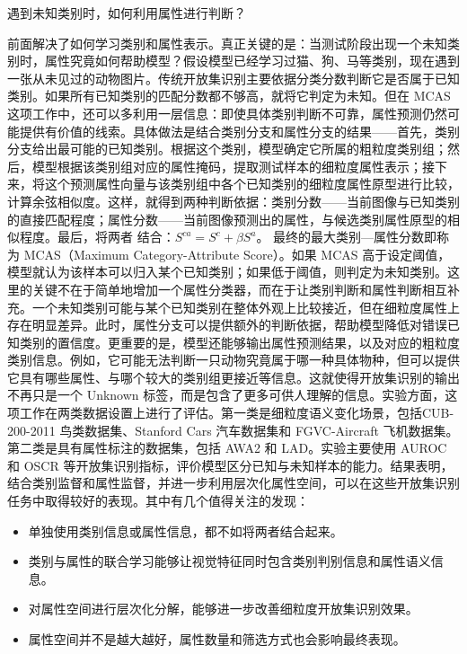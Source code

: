 遇到未知类别时，如何利用属性进行判断？

前面解决了如何学习类别和属性表示。真正关键的是：当测试阶段出现一个未知类别时，属性究竟如何帮助模型？假设模型已经学习过猫、狗、马等类别，现在遇到一张从未见过的动物图片。传统开放集识别主要依据分类分数判断它是否属于已知类别。如果所有已知类别的匹配分数都不够高，就将它判定为未知。但在 MCAS 这项工作中，还可以多利用一层信息：即使具体类别判断不可靠，属性预测仍然可能提供有价值的线索。具体做法是结合类别分支和属性分支的结果——首先，类别分支给出最可能的已知类别。根据这个类别，模型确定它所属的粗粒度类别组；然后，模型根据该类别组对应的属性掩码，提取测试样本的细粒度属性表示；接下来，将这个预测属性向量与该类别组中各个已知类别的细粒度属性原型进行比较，计算余弦相似度。这样，就得到两种判断依据：类别分数——当前图像与已知类别的直接匹配程度；属性分数——当前图像预测出的属性，与候选类别属性原型的相似程度。最后，将两者 结合：$S^{ca}=S^{c}+\beta S^{a}$。 最终的最大类别—属性分数即称为 MCAS（Maximum Category-Attribute Score）。如果 MCAS 高于设定阈值，模型就认为该样本可以归入某个已知类别；如果低于阈值，则判定为未知类别。这里的关键不在于简单地增加一个属性分类器，而在于让类别判断和属性判断相互补充。一个未知类别可能与某个已知类别在整体外观上比较接近，但在细粒度属性上存在明显差异。此时，属性分支可以提供额外的判断依据，帮助模型降低对错误已知类别的置信度。更重要的是，模型还能够输出属性预测结果，以及对应的粗粒度类别信息。例如，它可能无法判断一只动物究竟属于哪一种具体物种，但可以提供它具有哪些属性、与哪个较大的类别组更接近等信息。这就使得开放集识别的输出不再只是一个 Unknown 标签，而是包含了更多可供人理解的信息。实验方面，这项工作在两类数据设置上进行了评估。第一类是细粒度语义变化场景，包括CUB-200-2011 鸟类数据集、Stanford Cars 汽车数据集和 FGVC-Aircraft 飞机数据集。第二类是具有属性标注的数据集，包括 AWA2 和 LAD。实验主要使用 AUROC 和 OSCR 等开放集识别指标，评价模型区分已知与未知样本的能力。结果表明，结合类别监督和属性监督，并进一步利用层次化属性空间，可以在这些开放集识别任务中取得较好的表现。其中有几个值得关注的发现：

\begin{itemize}
  \item 单独使用类别信息或属性信息，都不如将两者结合起来。
  \item 类别与属性的联合学习能够让视觉特征同时包含类别判别信息和属性语义信息。
  \item 对属性空间进行层次化分解，能够进一步改善细粒度开放集识别效果。
  \item 属性空间并不是越大越好，属性数量和筛选方式也会影响最终表现。
\end{itemize}

